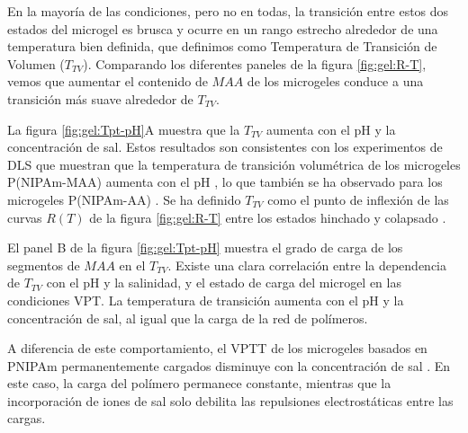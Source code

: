 En la mayor\'ia de las condiciones, pero no en todas, la transici\'on entre estos dos estados del microgel es brusca y ocurre en un rango estrecho alrededor de una temperatura bien definida, que definimos como Temperatura de Transici\'on de Volumen ($T_{TV}$). Comparando los diferentes paneles de la figura \ref{fig:gel:R-T}, vemos que aumentar el contenido de $MAA$ de los microgeles conduce a una transici\'on m\'as suave alrededor de $T_{TV}$.

La figura \ref{fig:gel:Tpt-pH}A muestra que la $T_{TV}$ aumenta con el pH y la concentraci\'on de sal. Estos resultados son consistentes con los experimentos de DLS que muestran que la temperatura de transici\'on volum\'etrica de los microgeles P(NIPAm-MAA) aumenta con el pH \cite{Kleinen2008}, lo que tambi\'en se ha observado para los microgeles P(NIPAm-AA) \cite{CaprilesGonzalez2008}. Se ha definido $T_{TV}$ como el punto de inflexi\'on de las curvas $R(T)$ de la figura \ref{fig:gel:R-T} entre los estados hinchado y colapsado \cite{Kratz2001}.

El panel B de la figura \ref{fig:gel:Tpt-pH} muestra el grado de carga de los segmentos de $MAA$ en el $T_{TV}$. Existe una clara correlaci\'on entre la dependencia de $T_{TV}$ con el pH y la salinidad, y el estado de carga del microgel en las condiciones VPT. La temperatura de transici\'on aumenta con el pH y la concentraci\'on de sal, al igual que la carga de la red de pol\'imeros.

A diferencia de este comportamiento, el VPTT de los microgeles basados en PNIPAm permanentemente cargados disminuye con la concentraci\'on de sal \cite{Lopez2020}. En este caso, la carga del pol\'imero permanece constante, mientras que la incorporaci\'on de iones de sal solo debilita las repulsiones electrost\'aticas entre las cargas.

